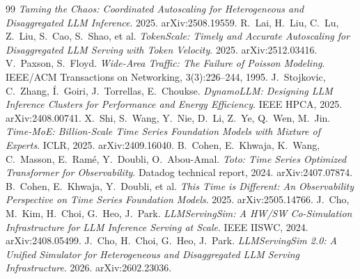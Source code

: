 \begin{thebibliography}{99}
\emph{Taming the Chaos: Coordinated Autoscaling for Heterogeneous and
Disaggregated LLM Inference}.
2025. arXiv:2508.19559.
R.~Lai, H.~Liu, C.~Lu, Z.~Liu, S.~Cao, S.~Shao, et al.
\emph{TokenScale: Timely and Accurate Autoscaling for Disaggregated LLM
Serving with Token Velocity}.
2025. arXiv:2512.03416.
V.~Paxson, S.~Floyd.
\emph{Wide-Area Traffic: The Failure of Poisson Modeling}.
IEEE/ACM Transactions on Networking, 3(3):226--244, 1995.
J.~Stojkovic, C.~Zhang, {\'I}.~Goiri, J.~Torrellas, E.~Choukse.
\emph{DynamoLLM: Designing LLM Inference Clusters for Performance and
Energy Efficiency}.
IEEE HPCA, 2025. arXiv:2408.00741.
X.~Shi, S.~Wang, Y.~Nie, D.~Li, Z.~Ye, Q.~Wen, M.~Jin.
\emph{Time-MoE: Billion-Scale Time Series Foundation Models with Mixture
of Experts}.
ICLR, 2025. arXiv:2409.16040.
B.~Cohen, E.~Khwaja, K.~Wang, C.~Masson, E.~Ram\'e, Y.~Doubli,
O.~Abou-Amal.
\emph{Toto: Time Series Optimized Transformer for Observability}.
Datadog technical report, 2024. arXiv:2407.07874.
B.~Cohen, E.~Khwaja, Y.~Doubli, et al.
\emph{This Time is Different: An Observability Perspective on Time Series
Foundation Models}.
2025. arXiv:2505.14766.
J.~Cho, M.~Kim, H.~Choi, G.~Heo, J.~Park.
\emph{LLMServingSim: A HW/SW Co-Simulation Infrastructure for LLM
Inference Serving at Scale}.
IEEE IISWC, 2024. arXiv:2408.05499.
J.~Cho, H.~Choi, G.~Heo, J.~Park.
\emph{LLMServingSim 2.0: A Unified Simulator for Heterogeneous and
Disaggregated LLM Serving Infrastructure}.
2026. arXiv:2602.23036.
\end{thebibliography}



